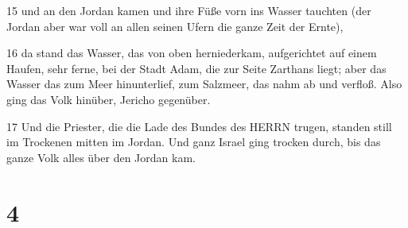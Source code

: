 \par 15 und an den Jordan kamen und ihre Füße vorn ins Wasser tauchten (der Jordan aber war voll an allen seinen Ufern die ganze Zeit der Ernte),
\par 16 da stand das Wasser, das von oben herniederkam, aufgerichtet auf einem Haufen, sehr ferne, bei der Stadt Adam, die zur Seite Zarthans liegt; aber das Wasser das zum Meer hinunterlief, zum Salzmeer, das nahm ab und verfloß. Also ging das Volk hinüber, Jericho gegenüber.
\par 17 Und die Priester, die die Lade des Bundes des HERRN trugen, standen still im Trockenen mitten im Jordan. Und ganz Israel ging trocken durch, bis das ganze Volk alles über den Jordan kam.

\chapter{4}

